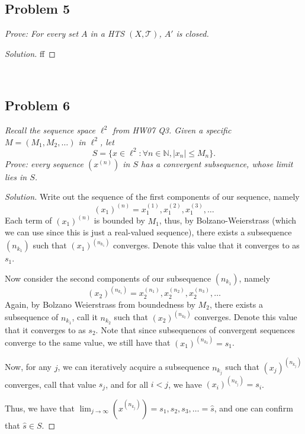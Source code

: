 \documentclass{article}
\newcommand{\N}{{\mathbb N}}
\begin{document}
\subsection*{Problem 5}
{\it Prove: For every set $A$ in a HTS $(X, \mathcal{T})$, $A'$ is closed.}

\begin{proof}[Solution]\let\qed\relax
	ff
\end{proof}
\clearpage
~\clearpage

\subsection*{Problem 6}
{\it Recall the sequence space $\ell^2$ from HW07 Q3.
Given a specific $M = (M_1,M_2,\dots)$ in $\ell^2$, let
\[
	S = \{x \in \ell^2 \colon \forall n \in \N, |x_n| \leq M_n\}.
\]
Prove: every sequence $\left(x^{(n)}\right)$ in $S$ has a convergent subsequence,
whose limit lies in $S$.}

\begin{proof}[Solution]\let\qed\relax
	Write out the sequence of the first components of our sequence, namely
	\[
		(x_1)^{(n)} = x_1^{(1)}, x_1^{(2)}, x_1^{(3)}, \dots
	\]
	Each term of $(x_1)^{(n)}$ is bounded by $M_1$,
	thus, by Bolzano-Weierstrass
	(which we can use since this is just a real-valued sequence),
	there exists a subsequence $(n_{k_1})$ such that
	$(x_1)^{(n_{k_1})}$ converges.
	Denote this value that it converges to as $s_1$.
	
	Now consider the second components of our subsequence $(n_{k_1})$, namely
	\[
		(x_2)^{(n_{k_1})} = x_2^{(n_1)}, x_2^{(n_2)}, x_2^{(n_3)}, \dots
	\]
	Again, by Bolzano Weierstrass from boundedness by $M_2$,
	there exists a subsequence of $n_{k_1}$, call it $n_{k_2}$ such that
	$(x_2)^{(n_{k_2})}$ converges.
	Denote this value that it converges to as $s_2$.
	Note that since subsequences of convergent sequences converge to the same value,
	we still have that $(x_1)^{(n_{k_2})} = s_1$.
	
	Now, for any $j$, we can iteratively acquire a subsequence $n_{k_j}$
	such that $(x_j)^{(n_{k_j})}$ converges, call that value $s_j$,
	and for all $i < j$, we have $(x_i)^{(n_{k_j})} = s_i$.

	Thus, we have that $\lim_{j\to\infty} \left(x^{(n_{k_j})}\right)
	 = s_1, s_2, s_3, \dots = \hat{s}$,
	 and one can confirm that $\hat{s} \in S$.
\end{proof}
\clearpage
\end{document}
